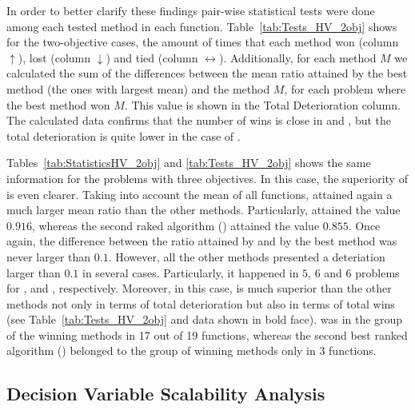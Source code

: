 


In order to better clarify these findings pair-wise statistical tests were done among each tested method in each
function.
%
Table~\ref{tab:Tests_HV_2obj} shows for the two-objective cases, the amount of times that each method won (column $\uparrow$),
lost (column $\downarrow$) and tied (column $\leftrightarrow$).
%
Additionally, for each method $M$ we calculated the sum of the differences between the mean \HV{} ratio attained by the best method (the ones with largest mean)
and the method $M$, for each problem where the best method won $M$.
%
This value is shown in the Total Deterioration column.
%
The calculated data confirms that the number of wins is close in \VSDMOEA{} and \RMOEA{}, but the total deterioration is quite lower in the case of \VSDMOEA{}.


Tables~\ref{tab:StatisticsHV_2obj} and \ref{tab:Tests_HV_2obj} shows the same information for the problems with three objectives.
%
In this case, the superiority of \VSDMOEA{} is even clearer.
%
Taking into account the mean of all functions, \VSDMOEA{} attained again a much larger mean \HV{} ratio than the other methods.
%
Particularly, \VSDMOEA{} attained the value $0.916$, whereas the second raked algorithm (\RMOEA{}) attained the value $0.855$.
%
Once again, the difference between the \HV{} ratio attained by \VSDMOEA{} and by the best method was never larger
than $0.1$.
%
However, all the other methods presented a deteriation larger than $0.1$ in several cases.
%
Particularly, it happened in $5$, $6$ and $6$ problems for \RMOEA{}, \NSGAII{} and \MOEAD{}, respectively.
%
Moreover, in this case, \VSDMOEA{} is much superior than the other methods not only in terms of total deterioration but also
in terms of total wins (see Table~\ref{tab:Tests_HV_2obj} and data shown in bold face).
%
\VSDMOEA{} was in the group of the winning methods in 17 out of 19 functions, whereas the second best ranked algorithm (\RMOEA{})
belonged to the group of winning methods only in 3 functions.

\subsection{Decision Variable Scalability Analysis}

